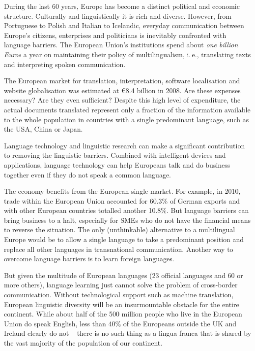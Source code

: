 \documentclass[10pt, plain]{../../metanetpaper}
\begin{document}
\begin{multicols}{2}
  During the last 60 years, Europe has become a distinct political and economic structure. Culturally and linguistically it is rich and diverse. However, from Portuguese to Polish and Italian to Icelandic, everyday communication between Europe's citizens, enterprises and politicians is inevitably confronted with language barriers. The European Union's institutions spend about \emph{one billion Euros} a year on maintaining their policy of multilingualism, i.\,e., translating texts and interpreting spoken communication.

  The European market for translation, interpretation, software localisation and website globalisation was estimated at €8.4 billion in 2008. Are these expenses necessary? Are they even sufficient? Despite this high level of expenditure, the actual documents translated represent only a fraction of the information available to the whole population in countries with a single predominant language, such as the USA, China or Japan.

Language technology and linguistic research can make a significant contribution to removing the linguistic barriers. Combined with intelligent devices and applications, language technology can help Europeans talk and do business together even if they do not speak a common language.

The economy benefits from the European single market. For example, in 2010, trade within the European Union accounted for 60.3\% of German exports and with other European countries totalled another 10.8\%. But language barriers can bring business to a halt, especially for SMEs who do not have the financial means to reverse the situation. The only (unthinkable) alternative to a multilingual Europe would be to allow a single language to take a predominant position and replace all other languages in transnational communication. Another way to overcome language barriers is to learn foreign languages.

But given the multitude of European languages (23 official languages and 60 or more others), language learning just cannot solve the problem of cross-border communication. Without technological support such as machine translation, European linguistic diversity will be an insurmountable obstacle for the entire continent. While about half of the 500 million people who live in the European Union do speak English, less than 40\% of the Europeans outside the UK and Ireland clearly do not -- there is no such thing as a lingua franca that is shared by the vast majority of the population of our continent. 


\end{multicols}
\end{document}
